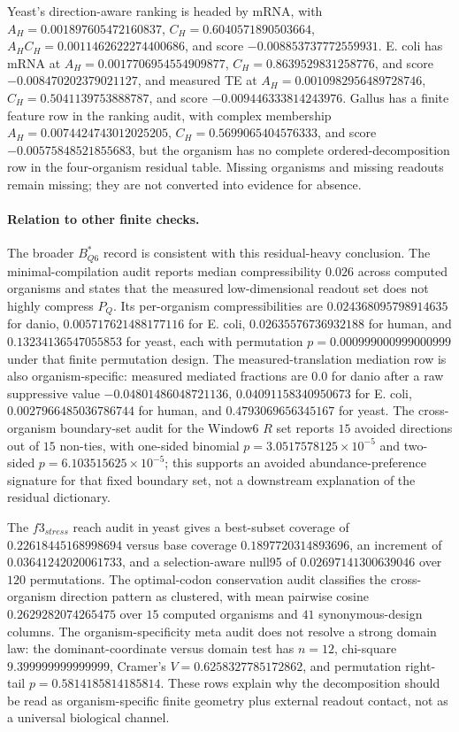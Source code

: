 Yeast's direction-aware ranking is headed by mRNA, with $A_H=0.001897605472160837$, $C_H=0.6040571890503664$, $A_HC_H=0.0011462622274400686$, and score $-0.008853737772559931$.  E. coli has mRNA at $A_H=0.0017706954554909877$, $C_H=0.8639529831258776$, and score $-0.008470202379021127$, and measured TE at $A_H=0.0010982956489728746$, $C_H=0.5041139753888787$, and score $-0.009446333814243976$.  Gallus has a finite feature row in the ranking audit, with complex membership $A_H=0.0074424743012025205$, $C_H=0.5699065404576333$, and score $-0.00575848521855683$, but the organism has no complete ordered-decomposition row in the four-organism residual table.  Missing organisms and missing readouts remain missing; they are not converted into evidence for absence.

\paragraph{Relation to other finite checks.}
The broader $B^*_{Q6}$ record is consistent with this residual-heavy conclusion.  The minimal-compilation audit reports median compressibility $0.026$ across computed organisms and states that the measured low-dimensional readout set does not highly compress $P_Q$.  Its per-organism compressibilities are $0.024368095798914635$ for danio, $0.005717621488177116$ for E. coli, $0.02635576736932188$ for human, and $0.13234136547055853$ for yeast, each with permutation $p=0.000999000999000999$ under that finite permutation design.  The measured-translation mediation row is also organism-specific: measured mediated fractions are $0.0$ for danio after a raw suppressive value $-0.04801486048721136$, $0.04091158340950673$ for E. coli, $0.0027966485036786744$ for human, and $0.4793069656345167$ for yeast.  The cross-organism boundary-set audit for the Window6 $R$ set reports $15$ avoided directions out of $15$ non-ties, with one-sided binomial $p=3.0517578125\times 10^{-5}$ and two-sided $p=6.103515625\times 10^{-5}$; this supports an avoided abundance-preference signature for that fixed boundary set, not a downstream explanation of the residual dictionary.

The $f3_{stress}$ reach audit in yeast gives a best-subset coverage of $0.22618445168998694$ versus base coverage $0.1897720314893696$, an increment of $0.03641242020061733$, and a selection-aware null95 of $0.02697141300639046$ over $120$ permutations.  The optimal-codon conservation audit classifies the cross-organism direction pattern as clustered, with mean pairwise cosine $0.2629282074265475$ over $15$ computed organisms and $41$ synonymous-design columns.  The organism-specificity meta audit does not resolve a strong domain law: the dominant-coordinate versus domain test has $n=12$, chi-square $9.399999999999999$, Cramer's $V=0.6258327785172862$, and permutation right-tail $p=0.5814185814185814$.  These rows explain why the decomposition should be read as organism-specific finite geometry plus external readout contact, not as a universal biological channel.

